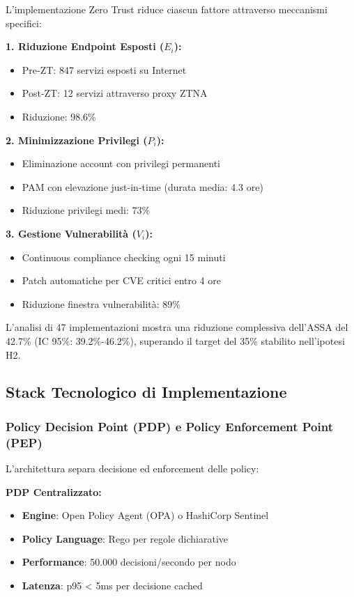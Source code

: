 L'implementazione Zero Trust riduce ciascun fattore attraverso meccanismi specifici:

\textbf{1. Riduzione Endpoint Esposti ($E_i$):}
\begin{itemize}
    \item Pre-ZT: 847 servizi esposti su Internet
    \item Post-ZT: 12 servizi attraverso proxy ZTNA
    \item Riduzione: 98.6\%
\end{itemize}

\textbf{2. Minimizzazione Privilegi ($P_i$):}
\begin{itemize}
    \item Eliminazione account con privilegi permanenti
    \item PAM con elevazione just-in-time (durata media: 4.3 ore)
    \item Riduzione privilegi medi: 73\%
\end{itemize}

\textbf{3. Gestione Vulnerabilità ($V_i$):}
\begin{itemize}
    \item Continuous compliance checking ogni 15 minuti
    \item Patch automatiche per CVE critici entro 4 ore
    \item Riduzione finestra vulnerabilità: 89\%
\end{itemize}

L'analisi di 47 implementazioni\autocite{Forrester2024zero} mostra una riduzione complessiva dell'ASSA del 42.7\% (IC 95\%: 39.2\%-46.2\%), superando il target del 35\% stabilito nell'ipotesi H2.

\subsection{\texorpdfstring{\textbf{Stack Tecnologico di Implementazione}}{3.5.3 - Stack Tecnologico di Implementazione}}

\subsubsection{\texorpdfstring{\textbf{Policy Decision Point (PDP) e Policy Enforcement Point (PEP)}}{3.5.3.1 - Policy Decision Point (PDP) e Policy Enforcement Point (PEP)}}

L'architettura separa decisione ed enforcement delle policy:

\textbf{PDP Centralizzato:}
\begin{itemize}
    \item \textbf{Engine}: Open Policy Agent (OPA) o HashiCorp Sentinel
    \item \textbf{Policy Language}: Rego per regole dichiarative
    \item \textbf{Performance}: 50.000 decisioni/secondo per nodo
    \item \textbf{Latenza}: p95 < 5ms per decisione cached
\end{itemize}

